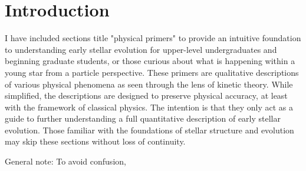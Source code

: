 \section{Introduction}
I have included sections title "physical primers" to provide an intuitive foundation to understanding early stellar evolution for upper-level undergraduates and beginning graduate students, or those curious about what is happening within a young star from a particle perspective. These primers are qualitative descriptions of various physical phenomena as seen through the lens of kinetic theory. While simplified, the descriptions are designed to preserve physical accuracy, at least with the framework of classical physics. The intention is that they only act as a guide to further understanding a full quantitative description of early stellar evolution. Those familiar with the foundations of stellar structure and evolution may skip these sections without loss of continuity.

General note: To avoid confusion, 